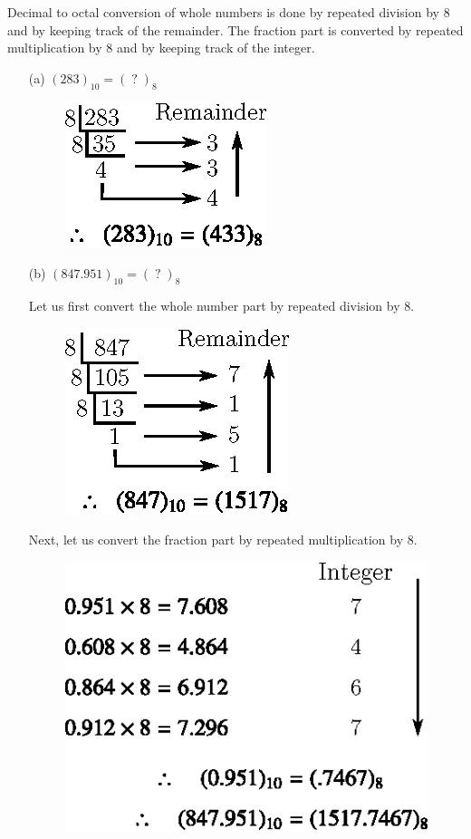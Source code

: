 \begin{solution}
Decimal to octal conversion of whole numbers is done by repeated division by 8 and by keeping track of the remainder. The fraction part is converted by repeated multiplication by 8 and by keeping track of the integer.
\begin{itemize}
\item[(a)] $(283)_{10}=(\;?\;)_{8}$
\begin{figure}[H]
\centering
\includegraphics[scale=1.1]{chap6/fig9.eps}
\end{figure}

\item[(b)] $(847.951)_{10}=(\;?\;)_{8}$

Let us first convert the whole number part by repeated division by 8.
\begin{figure}[H]
\centering
\includegraphics[scale=1.1]{chap6/fig10.eps}
\end{figure}

Next, let us convert the fraction part by repeated multiplication by 8.
\begin{figure}[H]
\centering
\includegraphics[scale=1.1]{chap6/fig11.eps}
\end{figure}


\end{itemize}
\end{solution}
